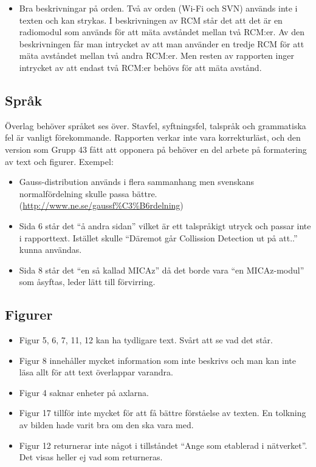 \documentclass[a4paper,11pt]{article}
\begin{document}
\begin{itemize}
   \item Bra beskrivningar på orden. Två av orden (Wi-Fi och SVN) används inte i texten och kan strykas. I beskrivningen av RCM står det att det är en radiomodul som används för att mäta avståndet mellan två RCM:er. Av den beskrivningen får man intrycket av att man använder en tredje RCM för att mäta avståndet mellan två andra RCM:er. Men resten av rapporten inger intrycket av att endast två RCM:er behövs för att mäta avstånd.
\end{itemize}

\subsection{Språk}

Överlag behöver språket ses över. Stavfel, syftningsfel, talspråk och grammatiska fel är vanligt förekommande. Rapporten verkar inte vara korrekturläst, och den version som Grupp 43 fått att opponera på behöver en del arbete på formatering av text och figurer. Exempel:

\begin{itemize}
   \item Gauss-distribution används i flera sammanhang men svenskans normalfördelning skulle passa bättre. (\url{http://www.ne.se/gaussf\%C3\%B6rdelning})
   \item Sida 6 står det “å andra sidan” vilket är ett talspråkigt utryck och passar inte i rapporttext. Istället skulle “Däremot går Collission Detection ut på att..” kunna användas.
   \item Sida 8 står det “en så kallad MICAz” då det borde vara “en MICAz-modul” som åsyftas, leder lätt till förvirring.
\end{itemize}

\subsection{Figurer}

\begin{itemize}
   \item Figur 5, 6, 7, 11, 12 kan ha tydligare text. Svårt att se vad det står.
   \item Figur 8 innehåller mycket information som inte beskrivs och man kan inte läsa allt för att text överlappar varandra.
   \item Figur 4 saknar enheter på axlarna.
   \item Figur 17 tillför inte mycket för att få bättre förståelse av texten. En tolkning av bilden hade varit bra om den ska vara med.
   \item Figur 12 returnerar inte något i tillståndet “Ange som etablerad i nätverket”. Det visas heller ej vad som returneras.
\end{itemize}
\end{document}

